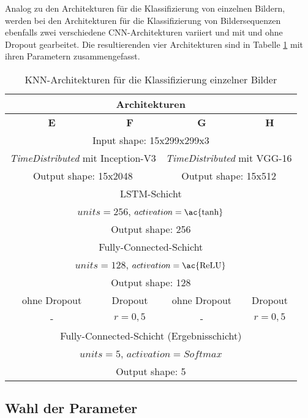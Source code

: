 Analog zu den Architekturen für die Klassifizierung von einzelnen Bildern, werden bei den Architekturen für die Klassifizierung von Bildersequenzen ebenfalls zwei verschiedene \ac{CNN}-Architekturen variiert und mit und ohne Dropout gearbeitet. Die resultierenden vier Architekturen sind in Tabelle \ref{tab_architekturen_video} mit ihren Parametern zusammengefasst.

\begin{table}[h]
\centering
\small
\def\arraystretch{1.4}
\begin{tabular}{|c|c|c|c|}
\hline
\multicolumn{4}{|c|}{\textbf{Architekturen}} \\
\hline
\textbf{E} & \textbf{F} & \textbf{G} & \textbf{H} \\
\hline
\hline
\multicolumn{4}{|c|}{Input shape: 15x299x299x3} \\
\hline
\multicolumn{2}{|c|}{\textit{TimeDistributed} mit Inception-V3} & \multicolumn{2}{|c|}{\textit{TimeDistributed} mit VGG-16} \\
\multicolumn{2}{|c|}{Output shape: 15x2048} & \multicolumn{2}{|c|}{Output shape: 15x512} \\
\hline
\multicolumn{4}{|c|}{\ac{LSTM}-Schicht} \\
\multicolumn{4}{|c|}{$units=256$, $activation=\text{\ac{tanh}}$} \\
\multicolumn{4}{|c|}{Output shape: 256} \\
\hline
\multicolumn{4}{|c|}{Fully-Connected-Schicht} \\
\multicolumn{4}{|c|}{$units=128$, $activation=\text{\ac{ReLU}}$} \\
\multicolumn{4}{|c|}{Output shape: 128} \\
\hline
ohne Dropout & Dropout & ohne Dropout & Dropout \\
- & $r=0,5$ & - & $r=0,5$ \\
\hline
\multicolumn{4}{|c|}{Fully-Connected-Schicht (Ergebnisschicht)} \\
\multicolumn{4}{|c|}{$units=5$, $activation=Softmax$} \\
\multicolumn{4}{|c|}{Output shape: 5} \\
\hline
\end{tabular}
\caption{\ac{KNN}-Architekturen für die Klassifizierung einzelner Bilder}
\label{tab_architekturen_video}
\end{table}


\subsection{Wahl der Parameter}
\label{umsetzung_training_experimente}

